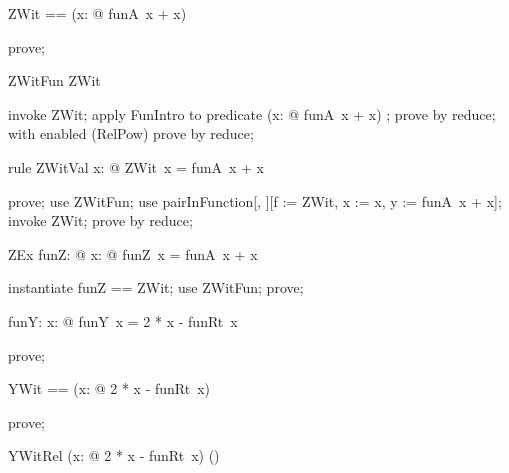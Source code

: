 \documentclass{article}
\begin{document}
\begin{zed}
  ZWit == (\lambda x: \nat @ funA~x + x)
\end{zed}

\begin{zproof}
prove;
\end{zproof}

\begin{theorem}{ZWitFun}
  ZWit \in \nat \fun \nat
\end{theorem}

\begin{zproof}
invoke ZWit;
apply FunIntro to predicate (\lambda x: \nat @ funA~x + x) \in \nat \fun \nat;
prove by reduce;
with enabled (RelPow) prove by reduce;
\end{zproof}

\begin{theorem}{rule ZWitVal}
  \forall x: \nat @ ZWit~x = funA~x + x
\end{theorem}

\begin{zproof}
prove;
use ZWitFun;
use pairInFunction[\nat, \nat][f := ZWit, x := x, y := funA~x + x];
invoke ZWit;
prove by reduce;
\end{zproof}

\begin{theorem}{ZEx}
  \exists funZ: \nat \fun \nat @ \forall x: \nat @ funZ~x = funA~x + x
\end{theorem}

\begin{zproof}
instantiate funZ == ZWit;
use ZWitFun;
prove;
\end{zproof}

\begin{axdef}
  funY: \nat \fun \nat
\where
   \forall x: \nat @ funY~x = 2 * x - funRt~x
\end{axdef}

\begin{zproof}
prove;
\end{zproof}

\begin{zed}
  YWit == (\lambda x: \nat @ 2 * x - funRt~x)
\end{zed}

\begin{zproof}
prove;
\end{zproof}

\begin{theorem}{YWitRel}
  (\lambda x: \nat @ 2 * x - funRt~x) \in \power (\nat \cross \nat)
\end{theorem}
\end{document}
